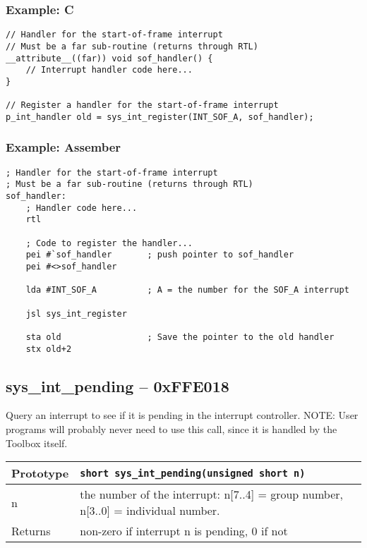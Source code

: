 \subsubsection*{Example: C}
\begin{lstlisting}
// Handler for the start-of-frame interrupt
// Must be a far sub-routine (returns through RTL)
__attribute__((far)) void sof_handler() {
	// Interrupt handler code here...
}

// Register a handler for the start-of-frame interrupt
p_int_handler old = sys_int_register(INT_SOF_A, sof_handler);
\end{lstlisting}

\subsubsection*{Example: Assember}
\begin{verbatim}
; Handler for the start-of-frame interrupt
; Must be a far sub-routine (returns through RTL)
sof_handler:
    ; Handler code here...
    rtl

    ; Code to register the handler...
    pei #`sof_handler       ; push pointer to sof_handler
    pei #<>sof_handler

    lda #INT_SOF_A          ; A = the number for the SOF_A interrupt
	
    jsl sys_int_register

    sta old                 ; Save the pointer to the old handler
    stx old+2
\end{verbatim}

\subsection*{sys\_int\_pending -- 0xFFE018}
Query an interrupt to see if it is pending in the interrupt controller.
NOTE: User programs will probably never need to use this call, since it is handled by the Toolbox itself.

\bigskip

\begin{tabular}{|l||l|} \hline
Prototype & \lstinline!short sys_int_pending(unsigned short n)! \\ \hline
n & the number of the interrupt: n[7..4] = group number, n[3..0] = individual number. \\ \hline
Returns & non-zero if interrupt n is pending, 0 if not \\ \hline
\end{tabular}


